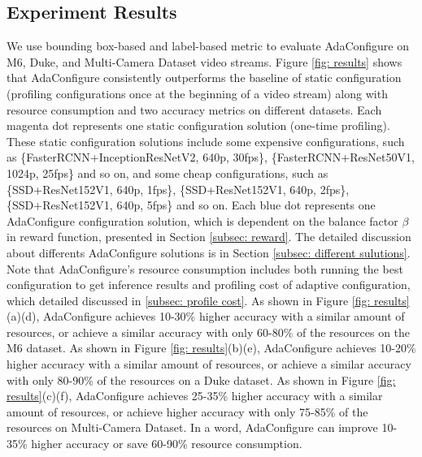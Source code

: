 \begin{table}[!t]
	\centering
	\label{tab: parameters}
	\caption{Experiment parameter}
	\label{tab: parameters}
\end{table}


\subsection{Experiment Results}
We use bounding box-based and label-based metric to evaluate AdaConfigure on M6, Duke, and Multi-Camera Dataset video streams. Figure \ref{fig: results} shows that AdaConfigure consistently outperforms the baseline of static configuration (profiling configurations once at the beginning of a video stream) along with resource consumption and two accuracy metrics on different datasets. Each magenta dot represents one static configuration solution (one-time profiling). These static configuration solutions include some expensive configurations, such as \{FasterRCNN+InceptionResNetV2, 640p, 30fps\}, \{FasterRCNN+ResNet50V1, 1024p, 25fps\} and so on, and some cheap configurations, such as \{SSD+ResNet152V1, 640p, 1fps\}, \{SSD+ResNet152V1, 640p, 2fps\}, \{SSD+ResNet152V1, 640p, 5fps\} and so on. Each blue dot represents one AdaConfigure configuration solution, which is dependent on the balance factor $\beta$ in reward function, presented in Section \ref{subsec: reward}. The detailed discussion about differents AdaConfigure solutions is in Section \ref{subsec: different sulutions}. Note that AdaConfigure's resource consumption includes both running the best configuration to get inference results and profiling cost of adaptive configuration, which detailed discussed in \ref{subsec: profile cost}. As shown in Figure \ref{fig: results}(a)(d), AdaConfigure achieves 10-30\% higher accuracy with a similar amount of resources, or achieve a similar accuracy with only 60-80\% of the resources on the M6 dataset. As shown in Figure \ref{fig: results}(b)(e), AdaConfigure achieves 10-20\% higher accuracy with a similar amount of resources, or achieve a similar accuracy with only 80-90\% of the resources on a Duke dataset. As shown in Figure \ref{fig: results}(c)(f), AdaConfigure achieves 25-35\% higher accuracy with a similar amount of resources, or achieve higher accuracy with only 75-85\% of the resources on Multi-Camera Dataset. In a word, AdaConfigure can improve 10-35\% higher accuracy or save 60-90\% resource consumption.


